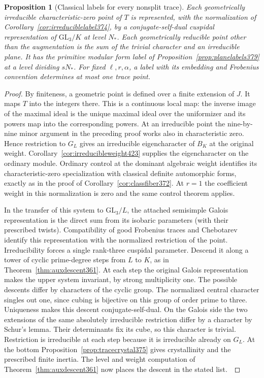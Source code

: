 \documentclass[a4paper,11pt]{article}
\newtheorem{proposition}{Proposition}[section]
\theoremstyle{definition}
\theoremstyle{remark}
\numberwithin{equation}{section}
\begin{document}
\begin{proposition}[Classical labels for every nonsplit trace]\leavevmode
\label{prop:alloriginalpoints424}
Each geometrically irreducible characteristic-zero point of \(T\)
is represented, with the normalization of
Corollary~\ref{cor:irreduciblelabel374}, by a conjugate-self-dual
cuspidal representation of \(\mathrm{GL}_3/K\) at level \(N_*\).
Each geometrically reducible point other than the augmentation is
the sum of the trivial character and an irreducible plane. It has
the primitive modular form label of Proposition~\ref{prop:planelabels379}
at a level dividing \(sN_*\). For fixed \(\ell,r,\alpha\), a label
with its embedding and Frobenius convention determines at most
one trace point.
\end{proposition}
\begin{proof}
By finiteness, a geometric point is defined over a finite extension
of \(J\). It maps \(T\) into the integers there. This is a
continuous local map: the inverse image of the maximal ideal
is the unique maximal ideal over the uniformizer and its powers
map into the corresponding powers. At an irreducible point
the nine-by-nine minor argument in the preceding proof works
also in characteristic zero. Hence restriction to \(G_L\)
gives an irreducible eigencharacter of \(B_K\) at the original
weight. Corollary~\ref{cor:irreducibleweight423} supplies the
eigencharacter on the ordinary module. Ordinary control at
the dominant algebraic weight identifies its characteristic-zero
specialization with classical definite automorphic forms, exactly
as in the proof of Corollary~\ref{cor:classfiber372}. At \(r=1\)
the coefficient weight in this normalization is zero and the
same control theorem applies.~\cite{IX-VII-geraghty363}

In the transfer of this system to \(\mathrm{GL}_3/L\), the
attached semisimple Galois representation is the direct sum
from its isobaric parameters (with their prescribed twists).
Compatibility of good Frobenius traces and Chebotarev identify
this representation with the normalized restriction of the point.
Irreducibility forces a single rank-three cuspidal parameter.
Descend it along a tower of cyclic prime-degree steps from \(L\)
to \(K\), as in Theorem~\ref{thm:auxdescent361}. At each step
the original Galois representation makes the upper system
invariant, by strong multiplicity one. The possible descents
differ by characters of the cyclic group. The normalized central
character singles out one, since cubing is bijective on this
group of order prime to three. Uniqueness makes this descent
conjugate-self-dual. On the Galois side the two extensions of the
same absolutely irreducible restriction differ by a character by
Schur's lemma. Their determinants fix its cube, so this character
is trivial. Restriction is irreducible at each step because
it is irreducible already on \(G_L\). At the bottom
Proposition~\ref{prop:tracecrystal375} gives crystallinity and
the prescribed finite inertia. The level and weight computation
of Theorem~\ref{thm:auxdescent361} now places the descent in the
stated list.~\cite{IX-VII-I-ac123,IX-VII-lgp361,IX-VII-V-shin}


\end{proof}
\end{document}
